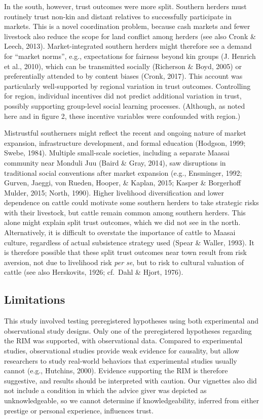 \documentclass[
  11pt,
]{article}
\begin{document}
In the south, however, trust outcomes were more split. Southern herders
must routinely trust non-kin and distant relatives to successfully
participate in markets. This is a novel coordination problem, because
cash markets and fewer livestock also reduce the scope for land conflict
among herders (see also Cronk \& Leech, 2013). Market-integrated
southern herders might therefore see a demand for ``market norms'',
e.g., expectations for fairness beyond kin groups (J. Henrich et al.,
2010), which can be transmitted socially (Richerson \& Boyd, 2005) or
preferentially attended to by content biases (Cronk, 2017). This account
was particularly well-supported by regional variation in trust outcomes.
Controlling for region, individual incentives did not predict additional
variation in trust, possibly supporting group-level social learning
processes. (Although, as noted here and in figure 2, these incentive
variables were confounded with region.)

Mistrustful southerners might reflect the recent and ongoing nature of
market expansion, infrastructure development, and formal education
(Hodgson, 1999; Swebe, 1984). Multiple small-scale societies, including
a separate Maasai community near Monduli Juu (Baird \& Gray, 2014), saw
disruptions in traditional social conventions after market expansion
(e.g., Ensminger, 1992; Gurven, Jaeggi, von Rueden, Hooper, \& Kaplan,
2015; Kasper \& Borgerhoff Mulder, 2015; North, 1990). Higher livelihood
diversification and lower dependence on cattle could motivate some
southern herders to take strategic risks with their livestock, but
cattle remain common among southern herders. This alone might explain
split trust outcomes, which we did not see in the north. Alternatively,
it is difficult to overstate the importance of cattle to Maasai culture,
regardless of actual subsistence strategy used (Spear \& Waller, 1993).
It is therefore possible that these split trust outcomes near town
result from risk aversion, not due to livelihood risk \emph{per se}, but
to risk to cultural valuation of cattle (see also Herskovits, 1926;
cf.~Dahl \& Hjort, 1976).

\hypertarget{limitations}{%
\subsection{Limitations}\label{limitations}}

This study involved testing preregistered hypotheses using both
experimental and observational study designs. Only one of the
preregistered hypotheses regarding the RIM was supported, with
observational data. Compared to experimental studies, observational
studies provide weak evidence for causality, but allow researchers to
study real-world behaviors that experimental studies usually cannot
(e.g., Hutchins, 2000). Evidence supporting the RIM is therefore
suggestive, and results should be interpreted with caution. Our
vignettes also did not include a condition in which the advice giver was
depicted as unknowledgeable, so we cannot determine if knowledgeability,
inferred from either prestige or personal experience, influences trust.
\end{document}
